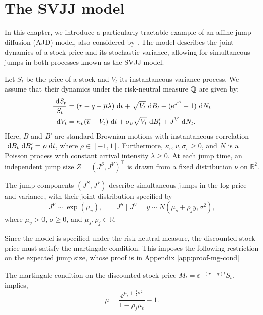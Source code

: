 \chapter{The SVJJ model}
\label{ch:svjj}

In this chapter, we introduce a particularly tractable example of an affine jump-diffusion (AJD)
model, also considered by \textcite{Duffie2000}. The model describes the joint dynamics of a
stock price and its stochastic variance, allowing for simultaneous jumps in both processes known as
the SVJJ model.

Let $S_t$ be the price of a stock and $V_t$ its instantaneous variance process. We assume that their
dynamics under the risk-neutral measure $\mathbb{Q}$ are given by:
\begin{align*} 
  \frac{\text{ d} S_t }{S_t}&= (r-q- \overline{\mu} \lambda) \text{ d} t + \sqrt{V_t}\text{ d} B_t  + (\text{e}^{J^{S}}-1) \text{ d} N_t\\ 
  \text{ d} V_t &= \kappa_v(\overline{v}- V_t) \text{ d} t + \sigma_v \sqrt{V_t}\text{ d} B_t' + J^{V}\text{ d} N_t
.\end{align*}
Here, $B$ and $B'$ are standard Brownian motions with instantaneous correlation $\text{ d} B_t\text{ d}
B_t'=\rho\text{ d} t$, where $\rho\in[-1,1]$. Furthermore, $\kappa_v,\overline{v},\sigma_v\geq 0$, and $N$
is a Poisson process with constant arrival intensity $\lambda\geq 0$. At each jump time, an
independent jump size $Z=(J^S,J^V)^\top$ is drawn from a fixed distribution $\nu$ on
$\mathbb{R}^2$.

The jump components $(J^S,J^V)$ describe simultaneous jumps in the log-price and variance, with
their joint distribution specified by
\[
  J^V\sim\exp(\mu_v),
  \qquad
  J^S\mid J^V=y\sim
  N(\mu_s+\rho_j y,\sigma^2),
\]
where $\mu_v>0$, $\sigma\geq 0$, and $\mu_s,\rho_j\in\mathbb{R}$.

Since the model is specified under the risk-neutral measure, the discounted stock price must satisfy
the martingale condition. This imposes the following restriction on the expected jump size, whose
proof is in Appendix \ref{app:proof-mg-cond}
\begin{proposition}
\label{prop:svjj-mg-cond}
The martingale condition on the discounted stock price $M_t=\ee^{-(r-q)t}S_t$. implies,
\[ 
\overline{\mu} = \frac{\ee^{\mu_s + \frac{1}{2} \sigma^2 }}{1-\rho_j \mu_v} -1
.\]
\end{proposition}

